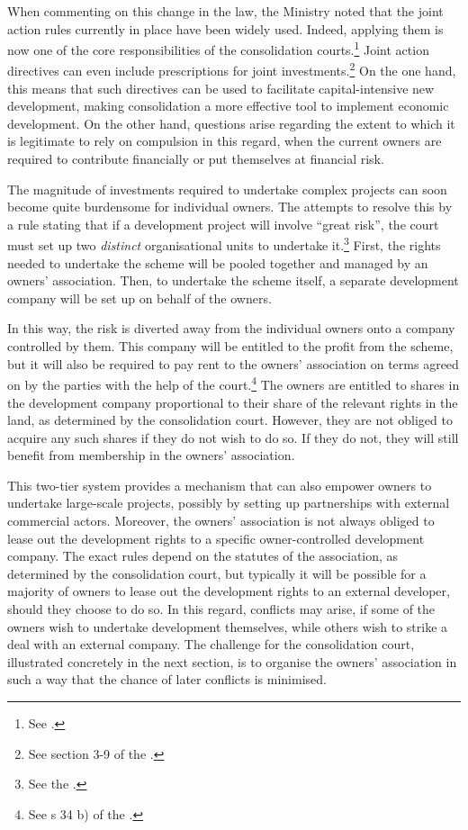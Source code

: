 When commenting on this change in the law, the Ministry noted that the joint action rules currently in place have been widely used. Indeed, applying them is now one of the core responsibilities of the consolidation courts.\footnote{See \cite[146]{prop12}.} Joint action directives can even include prescriptions for joint investments.\footnote{See section 3-9 of the \cite{lca13}.} On the one hand, this means that such directives can be used to facilitate capital-intensive new development, making consolidation a more effective tool to implement economic development. On the other hand, questions arise regarding the extent to which it is legitimate to rely on compulsion in this regard, when the current owners are required to contribute financially or put themselves at financial risk.

The magnitude of investments required to undertake complex projects can soon become quite burdensome for individual owners. The \cite{lca79} attempts to resolve this by a rule stating that if a development project will involve ``great risk'', the court must set up two \emph{distinct} organisational units to undertake it.\footnote{See the \dni\cite[34 b)|42]{lca79}.} First, the rights needed to undertake the scheme will be pooled together and managed by an owners' association. Then, to undertake the scheme itself, a separate development company will be set up on behalf of the owners.

In this way, the risk is diverted away from the individual owners onto a company controlled by them. This company will be entitled to the profit from the scheme, but it will also be required to pay rent to the owners' association on terms agreed on by the parties with the help of the court.\footnote{See s 34 b) of the \cite{lca79}.} The owners are entitled to shares in the development company proportional to their share of the relevant rights in the land, as determined by the consolidation court. However, they are not obliged to acquire any such shares if they do not wish to do so. If they do not, they will still benefit from membership in the owners' association.

This two-tier system provides a mechanism that can also empower owners to undertake large-scale projects, possibly by setting up partnerships with external commercial actors. Moreover, the owners' association is not always obliged to lease out the development rights to a specific owner-controlled development company. The exact rules depend on the statutes of the association, as determined by the consolidation court, but typically it will be possible for a majority of owners to lease out the development rights to an external developer, should they choose to do so. In this regard, conflicts may arise, if some of the owners wish to undertake development themselves, while others wish to strike a deal with an external company. The challenge for the consolidation court, illustrated concretely in the next section, is to organise the owners' association in such a way that the chance of later conflicts is minimised.

